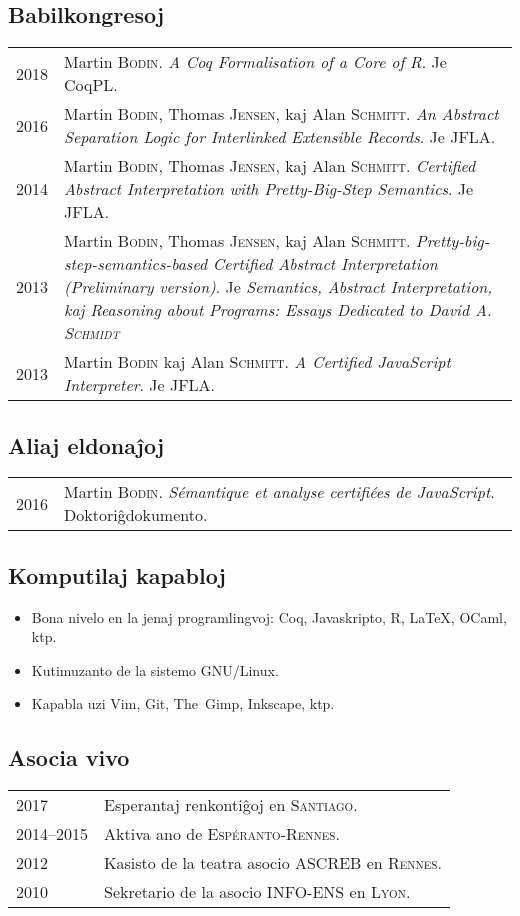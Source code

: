 \documentclass[12pt,a4paper]{article}
\makeatletter
\newenvironment{datecvsection}[1]%
               {\subsection*{#1}%
                 \noindent \begin{tabular}{@{}p{\annee}p{\texte}@{}}}
               {\end{tabular}}
\newenvironment{itemcvsection}[1]%
               {\subsection*{#1}\begin{itemize}}
               {\end{itemize}}
\makeatother
\begin{document}
\begin{datecvsection}{Babilkongresoj}

  2018 & Martin \textsc{Bodin}. \textit{A Coq Formalisation of a Core of R}. Je CoqPL. \\

  2016 & Martin \textsc{Bodin}, Thomas \textsc{Jensen}, kaj Alan \textsc{Schmitt}. \textit{An Abstract Separation Logic for Interlinked Extensible Records}. Je JFLA. \\

  2014 & Martin \textsc{Bodin}, Thomas \textsc{Jensen}, kaj Alan \textsc{Schmitt}. \textit{Certified Abstract Interpretation with Pretty-Big-Step Semantics}. Je JFLA. \\

  2013 & Martin \textsc{Bodin}, Thomas \textsc{Jensen}, kaj Alan \textsc{Schmitt}. \textit{Pretty-big-step-semantics-based Certified Abstract Interpretation (Preliminary version)}. Je \textit{Semantics, Abstract Interpretation, kaj Reasoning about Programs: Essays Dedicated to David A. \textsc{Schmidt}} \\ %

  2013 & Martin \textsc{Bodin} kaj Alan \textsc{Schmitt}. \textit{A Certified JavaScript Interpreter}. Je JFLA. \\

\end{datecvsection}

\begin{datecvsection}{Aliaj eldonaĵoj}

    2016 & Martin \textsc{Bodin}. \textit{Sémantique et analyse certifiées de JavaScript}. Doktoriĝdokumento. \\

\end{datecvsection}

\begin{itemcvsection}{Komputilaj kapabloj}

  \item Bona nivelo en la jenaj programlingvoj:  Coq, Javaskripto, R, \LaTeX, OCaml, ktp.
  \item Kutimuzanto de la sistemo GNU/Linux.
  \item Kapabla uzi Vim, Git, The~Gimp, Inkscape, ktp.

\end{itemcvsection}

\begin{datecvsection}{Asocia vivo}

    2017 & Esperantaj renkontiĝoj en \textsc{Santiago}. \\
    2014–2015 & Aktiva ano de \textsc{Espéranto-Rennes}. \\
	2012 & Kasisto de la teatra asocio \textsc{ASCREB} en \textsc{Rennes}. \\
	2010 & Sekretario de la asocio \textsc{INFO-ENS} en \textsc{Lyon}.

\end{datecvsection}
\end{document}
